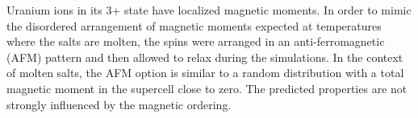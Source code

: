 \documentclass[titlepage=firstiscover,11pt,fleqn,headheight=14pt,footheight=40.8pt]{scrreprt}
\begin{document}
Uranium ions in its 3+ state have localized magnetic moments. In order to mimic the disordered arrangement of magnetic moments expected at temperatures where the salts are molten, the spins were arranged in an anti-ferromagnetic (AFM) pattern and then allowed to relax during the simulations. In the context of molten salts, the AFM option is similar to a random distribution with a total magnetic moment in the supercell close to zero. %
The predicted properties are not strongly influenced by the magnetic ordering. %

\end{document}
